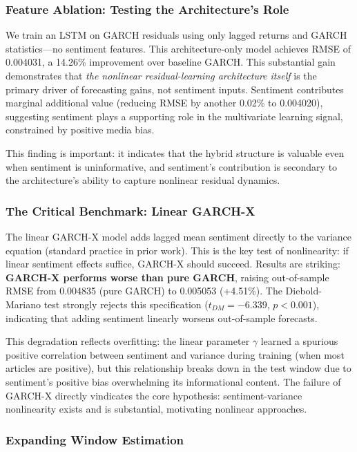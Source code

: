 \subsubsection{Feature Ablation: Testing the Architecture's Role}

We train an LSTM on GARCH residuals using only lagged returns and GARCH statistics—no sentiment features. This architecture-only model achieves RMSE of 0.004031, a 14.26\% improvement over baseline GARCH. This substantial gain demonstrates that \textit{the nonlinear residual-learning architecture itself} is the primary driver of forecasting gains, not sentiment inputs. Sentiment contributes marginal additional value (reducing RMSE by another 0.02\% to 0.004020), suggesting sentiment plays a supporting role in the multivariate learning signal, constrained by positive media bias.

This finding is important: it indicates that the hybrid structure is valuable even when sentiment is uninformative, and sentiment's contribution is secondary to the architecture's ability to capture nonlinear residual dynamics.

\subsubsection{The Critical Benchmark: Linear GARCH-X}

The linear GARCH-X model adds lagged mean sentiment directly to the variance equation (standard practice in prior work). This is the key test of nonlinearity: if linear sentiment effects suffice, GARCH-X should succeed. Results are striking: \textbf{GARCH-X performs worse than pure GARCH}, raising out-of-sample RMSE from 0.004835 (pure GARCH) to 0.005053 (+4.51\%). The Diebold-Mariano test strongly rejects this specification ($t_{DM} = -6.339$, $p < 0.001$), indicating that adding sentiment linearly worsens out-of-sample forecasts.

This degradation reflects overfitting: the linear parameter $\gamma$ learned a spurious positive correlation between sentiment and variance during training (when most articles are positive), but this relationship breaks down in the test window due to sentiment's positive bias overwhelming its informational content. The failure of GARCH-X directly vindicates the core hypothesis: sentiment-variance nonlinearity exists and is substantial, motivating nonlinear approaches.

\subsubsection{Expanding Window Estimation}

